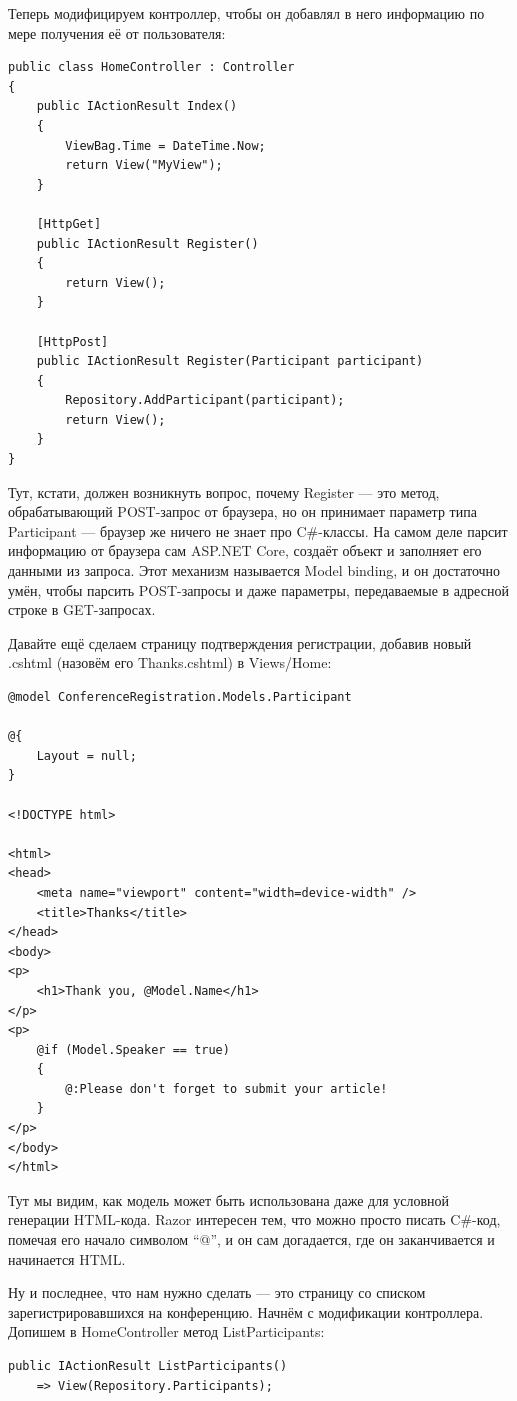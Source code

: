 \documentclass[a5paper]{article}
\begin{document}
Теперь модифицируем контроллер, чтобы он добавлял в него информацию по мере получения её от пользователя:

\begin{verbatim}
public class HomeController : Controller
{
    public IActionResult Index()
    {
        ViewBag.Time = DateTime.Now;
        return View("MyView");
    }

    [HttpGet]
    public IActionResult Register()
    {
        return View();
    }

    [HttpPost]
    public IActionResult Register(Participant participant)
    {
        Repository.AddParticipant(participant);
        return View();
    }
}
\end{verbatim}

Тут, кстати, должен возникнуть вопрос, почему Register --- это метод, обрабатывающий POST-запрос от браузера, но он принимает параметр типа Participant --- браузер же ничего не знает про C\#-классы. На самом деле парсит информацию от браузера сам ASP.NET Core, создаёт объект и заполняет его данными
из запроса. Этот механизм называется Model binding, и он достаточно умён, чтобы парсить POST-запросы и даже параметры, передаваемые в адресной строке в GET-запросах.

Давайте ещё сделаем страницу подтверждения регистрации, добавив новый .cshtml (назовём его Thanks.cshtml) в Views/Home:

\begin{verbatim}
@model ConferenceRegistration.Models.Participant

@{
    Layout = null;
}

<!DOCTYPE html>

<html>
<head>
    <meta name="viewport" content="width=device-width" />
    <title>Thanks</title>
</head>
<body>
<p>
    <h1>Thank you, @Model.Name</h1>
</p>
<p>
    @if (Model.Speaker == true)
    {
        @:Please don't forget to submit your article!
    }
</p>
</body>
</html>
\end{verbatim}

Тут мы видим, как модель может быть использована даже для условной генерации HTML-кода. Razor интересен тем, что можно просто писать C\#-код, помечая его начало символом ``@'', и он сам догадается, где он заканчивается и начинается HTML.

Ну и последнее, что нам нужно сделать --- это страницу со списком зарегистрировавшихся на конференцию. Начнём с модификации контроллера. Допишем в HomeController метод ListParticipants:
\begin{verbatim}
public IActionResult ListParticipants()
    => View(Repository.Participants);
\end{verbatim}
\end{document}
